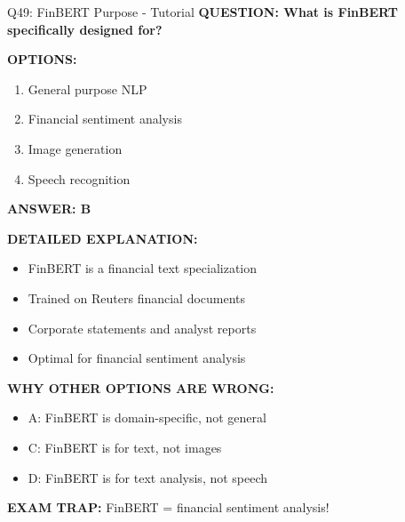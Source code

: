\documentclass[8pt]{beamer}
\begin{document}
	\begin{frame}{Q49: FinBERT Purpose - Tutorial}
		\fontsize{6.5}{7.5}\selectfont
		\textbf{QUESTION: What is FinBERT specifically designed for?}
		
		\vspace{0.1cm}
		\textbf{OPTIONS:}
		\begin{enumerate}
			\item General purpose NLP
			\item Financial sentiment analysis
			\item Image generation
			\item Speech recognition
		\end{enumerate}
		
		\vspace{0.1cm}
		\textcolor{myblue}{\textbf{ANSWER: B}}
		
		\vspace{0.1cm}
		\textbf{DETAILED EXPLANATION:}
		\begin{itemize}
			\item FinBERT is a financial text specialization
			\item Trained on Reuters financial documents
			\item Corporate statements and analyst reports
			\item Optimal for financial sentiment analysis
		\end{itemize}
		
		\vspace{0.1cm}
		\textcolor{myred}{\textbf{WHY OTHER OPTIONS ARE WRONG:}}
		\begin{itemize}
			\item \textcolor{myred}{A:} FinBERT is domain-specific, not general
			\item \textcolor{myred}{C:} FinBERT is for text, not images
			\item \textcolor{myred}{D:} FinBERT is for text analysis, not speech
		\end{itemize}
		
		\textcolor{myred}{\textbf{EXAM TRAP:}} FinBERT = \textcolor{myblue}{financial sentiment analysis}!
	\end{frame}
	
\end{document}
